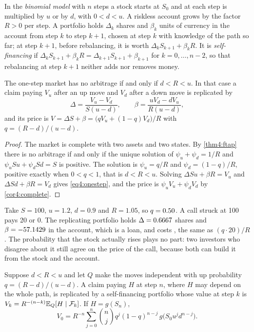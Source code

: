 \begin{chapterrefs}
\begin{definition}\label{def4:binomial}
In the \emph{binomial model} with $n$ steps a stock starts at $S_0$ and at each step is multiplied by
$u$ or by $d$, with $0<d<u$. A riskless account grows by the factor $R>0$ per step. A portfolio holds
$\Delta_k$ shares and $\beta_k$ units of currency in the account from step $k$ to step $k+1$, chosen at
step $k$ with knowledge of the path so far; at step $k+1$, before rebalancing, it is worth
$\Delta_kS_{k+1}+\beta_kR$. It is \emph{self-financing} if
$\Delta_kS_{k+1}+\beta_kR=\Delta_{k+1}S_{k+1}+\beta_{k+1}$ for $k=0,\dots,n-2$, so that rebalancing at
step $k+1$ neither adds nor removes money.
\end{definition}

\begin{proposition}\label{prop4:onestep}
The one-step market has no arbitrage if and only if $d<R<u$. In that case a claim paying $V_u$ after
an up move and $V_d$ after a down move is replicated by
\begin{equation}\label{eq4:onestep}
  \Delta=\frac{V_u-V_d}{S(u-d)},\qquad \beta=\frac{uV_d-dV_u}{R(u-d)},
\end{equation}
and its price is $V=\Delta S+\beta=\bigl(qV_u+(1-q)V_d\bigr)/R$ with $q=(R-d)/(u-d)$.
\end{proposition}

\begin{proof}
The market is complete with two assets and two states. By \cref{thm4:ftap} there is no arbitrage if and
only if the unique solution of $\psi_u+\psi_d=1/R$ and $\psi_uSu+\psi_dSd=S$ is positive. The solution
is $\psi_u=q/R$ and $\psi_d=(1-q)/R$, positive exactly when $0<q<1$, that is $d<R<u$. Solving
$\Delta Su+\beta R=V_u$ and $\Delta Sd+\beta R=V_d$ gives \cref{eq4:onestep}, and the price is
$\psi_uV_u+\psi_dV_d$ by \cref{cor4:complete}.
\end{proof}

Take $S=100$, $u=1.2$, $d=0.9$ and $R=1.05$, so $q=0.50$. A call struck at 100 pays 20 or 0. The
replicating portfolio holds $\Delta=0.6667$ shares and $\beta=-57.1429$ in the account, which is a loan, and costs \opPrice, the same
as $(q\cdot20)/R$. The probability that the stock actually rises plays no part: two investors who
disagree about it still agree on the price of the call, because both can build it from the stock and
the account.

\begin{theorem}\label{thm4:tree}
Suppose $d<R<u$ and let $Q$ make the moves independent with up probability $q=(R-d)/(u-d)$. A claim
paying $H$ at step $n$, where $H$ may depend on the whole path, is replicated by a self-financing
portfolio whose value at step $k$ is $V_k=R^{-(n-k)}\mathbb{E}_Q[H\mid\mathcal F_k]$. If $H=g(S_n)$,
\begin{equation}\label{eq4:binsum}
  V_0=R^{-n}\sum_{j=0}^n\binom nj q^j(1-q)^{n-j}\,g\bigl(S_0u^jd^{n-j}\bigr).
\end{equation}
\end{theorem}


\end{chapterrefs}
